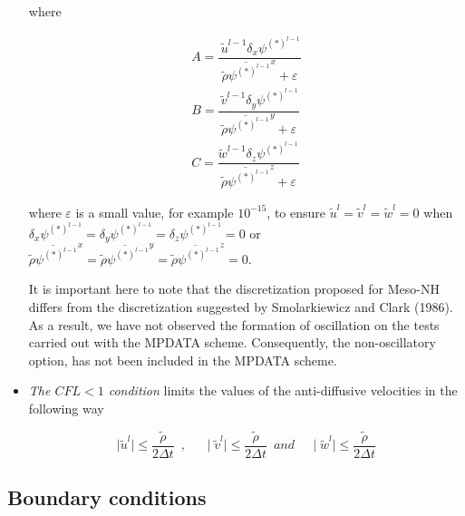 \begin{itemize}
\noindent where

\begin{eqnarray}
\label{equA}
A =
 \dfrac{ \, \tilde{u}^{l-1} \delta_{x} \psi^{(*)^{l-1}}   }
{ \overline{\tilde{\rho} \psi^{(*)^{l-1}}}^x +\varepsilon }   \\
\label{equB}
B =
 \dfrac{ \, \tilde{v}^{l-1} \delta_{y} \psi^{(*)^{l-1}}   }
{ \overline{\tilde{\rho} \psi^{(*)^{l-1}}}^y +\varepsilon }   \\
\label{equC}
C =
 \dfrac{    \tilde{w}^{l-1} \delta_{z} \psi^{(*)^{l-1}}   }
{ \overline{\tilde{\rho} \psi^{(*)^{l-1}}}^z +\varepsilon }
\end{eqnarray}

\noindent where $\varepsilon$ is a small value, for example $10^{-15}$, to
ensure $\tilde{u}^{l}=\tilde{v}^{l}=\tilde{w}^{l}=0$ when
$\delta_{x} \psi^{(*)^{l-1}}=\delta_{y} \psi^{(*)^{l-1}}=
\delta_{z} \psi^{(*)^{l-1}}=0$ or $\overline{\tilde{\rho} \psi^{(*)^{l-1}}}^x=
\overline{\tilde{\rho} \psi^{(*)^{l-1}}}^y=
\overline{\tilde{\rho} \psi^{(*)^{l-1}}}^z=0$.

It is important here to note that the discretization proposed for Meso-NH
differs from the discretization suggested by Smolarkiewicz and Clark (1986). As a
result, we have not observed the formation of oscillation on the tests carried
out with the MPDATA scheme. Consequently, the non-oscillatory option, has not been
included in the MPDATA scheme.

\item {\em The $CFL<1$ condition } limits the values of the anti-diffusive velocities
in the following way

\begin{equation}
\mid\tilde{u}^{l}\mid\leq \dfrac{\tilde{\rho}}{2 \Delta t} \, \, \, , \, \, \, \, \, \, \, \,
\mid\tilde{v}^{l}\mid\leq \dfrac{\tilde{\rho}}{2 \Delta t} \, \, \, and \, \, \, \, \, \, \,
\mid\tilde{w}^{l}\mid\leq \dfrac{\tilde{\rho}}{2 \Delta t}
\end{equation}

\end{itemize}

\subsection{Boundary conditions}

